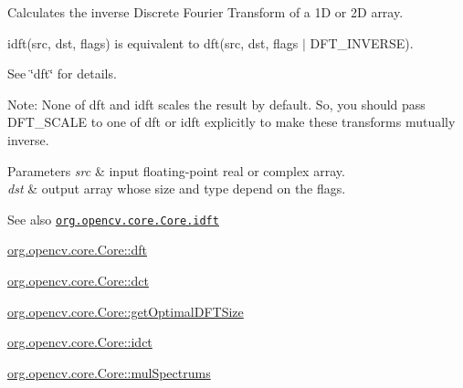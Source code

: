 Calculates the inverse Discrete Fourier Transform of a 1D or 2D array.

{\ttfamily idft(src, dst, flags)} is equivalent to {\ttfamily dft(src, dst, flags $\vert$ D\+F\+T\+\_\+\+I\+N\+V\+E\+R\+SE)}.

See \char`\"{}dft\char`\"{} for details.

Note\+: None of {\ttfamily dft} and {\ttfamily idft} scales the result by default. So, you should pass {\ttfamily D\+F\+T\+\_\+\+S\+C\+A\+LE} to one of {\ttfamily dft} or {\ttfamily idft} explicitly to make these transforms mutually inverse.


\begin{DoxyParams}{Parameters}
{\em src} & input floating-\/point real or complex array. \\
\hline
{\em dst} & output array whose size and type depend on the {\ttfamily flags}.\\
\hline
\end{DoxyParams}
\begin{DoxySeeAlso}{See also}
\href{http://docs.opencv.org/modules/core/doc/operations_on_arrays.html#idft}{\tt org.\+opencv.\+core.\+Core.\+idft} 

\mbox{\hyperlink{classorg_1_1opencv_1_1core_1_1_core_a43313221157a3008972a04727a65a58d}{org.\+opencv.\+core.\+Core\+::dft}} 

\mbox{\hyperlink{classorg_1_1opencv_1_1core_1_1_core_a1f0b3c28295d4db1ecd755201833d6cb}{org.\+opencv.\+core.\+Core\+::dct}} 

\mbox{\hyperlink{classorg_1_1opencv_1_1core_1_1_core_a9818ffe89dca479da8352d5bf6ebd6b3}{org.\+opencv.\+core.\+Core\+::get\+Optimal\+D\+F\+T\+Size}} 

\mbox{\hyperlink{classorg_1_1opencv_1_1core_1_1_core_a64eb690877f2d4ac16c1b1c3375c0b7b}{org.\+opencv.\+core.\+Core\+::idct}} 

\mbox{\hyperlink{classorg_1_1opencv_1_1core_1_1_core_a249146033929c968ef948e290c2a438c}{org.\+opencv.\+core.\+Core\+::mul\+Spectrums}} 
\end{DoxySeeAlso}
\mbox{\label{classorg_1_1opencv_1_1core_1_1_core_adda843559663a35e9a710c93b1f86096}} 

